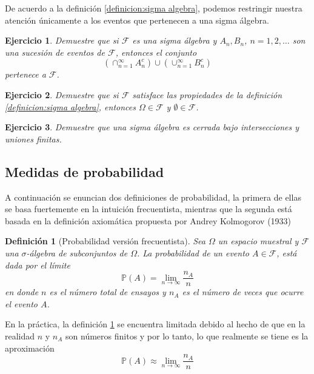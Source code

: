 \documentclass[11pt]{report}
\theoremstyle{break}
\newtheorem{definicion}{Definición}[chapter]
\newtheorem{ejercicio}{Ejercicio}[chapter]
\theoremstyle{break}
\begin{document}
De acuerdo a la definición \ref{definicion:sigma algebra}, podemos restringir nuestra atención únicamente a los eventos que pertenecen a una sigma álgebra.

\begin{ejercicio}
Demuestre que si $\mathcal{F}$ es una sigma álgebra y $A_n, B_n$, $n=1,2,\ldots$ son una sucesión de eventos de $\mathcal{F}$, entonces el conjunto
$$
\left(\cap_{n = 1}^{\infty} A_{n}^{c}  \right) \cup \left(\cup_{n = 1}^{\infty} B_{n}^{c}  \right)
$$
pertenece a $\mathcal{F}$.
\end{ejercicio}

\begin{ejercicio}
Demuestre que si $\mathcal{F}$ satisface las propiedades de la definición \ref{definicion:sigma algebra}, entonces $\Omega \in \mathcal{F}$ y $\emptyset \in \mathcal{F}$.
\end{ejercicio}

\begin{ejercicio}
Demuestre que una sigma álgebra es cerrada bajo intersecciones y uniones finitas.
\end{ejercicio}

\subsection{Medidas de probabilidad}
\label{seccion:medidas de probabilidad}
A continuación se enuncian dos definiciones de  probabilidad, la primera de ellas se basa fuertemente en la intuición frecuentista, mientras que la segunda está basada en la definición axiomática propuesta por Andrey Kolmogorov (1933)

\begin{definicion}[Probabilidad versión frecuentista]
\label{definicion:probabilidad frecuentista}
Sea $\Omega$ un espacio muestral y $\mathcal{F}$ una $\sigma$-álgebra de subconjuntos de $\Omega$. La probabilidad de un evento $A \in \mathcal{F}$, está dada por el límite
$$
\mathbb{P}(A) = \lim_{n \rightarrow \infty} \dfrac{n_A}{n}
$$
en donde $n$ es el número total de ensayos y $n_A$ es el número de veces que ocurre el evento $A$.
\end{definicion}
En la práctica, la definición \ref{definicion:probabilidad frecuentista} se encuentra limitada debido al hecho de que en la realidad $n$ y $n_A$ son números finitos y por lo tanto, lo que realmente se tiene es la aproximación
$$
\mathbb{P}(A) \approx \lim_{n \rightarrow \infty} \dfrac{n_A}{n}
$$
\end{document}
